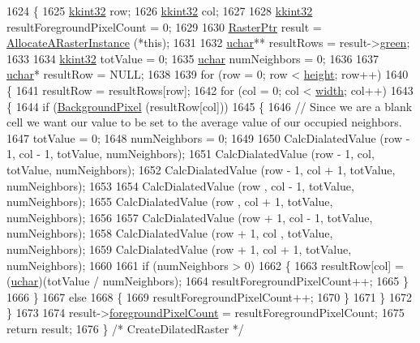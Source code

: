 \begin{DoxyCode}
1624 \{
1625   \hyperlink{namespace_k_k_b_a8fa4952cc84fda1de4bec1fbdd8d5b1b}{kkint32}  row;
1626   \hyperlink{namespace_k_k_b_a8fa4952cc84fda1de4bec1fbdd8d5b1b}{kkint32}  col;
1627 
1628   \hyperlink{namespace_k_k_b_a8fa4952cc84fda1de4bec1fbdd8d5b1b}{kkint32}  resultForegroundPixelCount = 0;
1629 
1630   \hyperlink{class_k_k_b_1_1_raster}{RasterPtr}  result = \hyperlink{class_k_k_b_1_1_raster_aa879980d112c01cb7ad9a3cfc7cd6f64}{AllocateARasterInstance} (*\textcolor{keyword}{this});
1631 
1632   \hyperlink{namespace_k_k_b_ace9969169bf514f9ee6185186949cdf7}{uchar}** resultRows = result->\hyperlink{class_k_k_b_1_1_raster_a2d2238911145488e226cd2e34fc8448c}{green};
1633 
1634   \hyperlink{namespace_k_k_b_a8fa4952cc84fda1de4bec1fbdd8d5b1b}{kkint32}  totValue     = 0;
1635   \hyperlink{namespace_k_k_b_ace9969169bf514f9ee6185186949cdf7}{uchar}  numNeighbors = 0;
1636 
1637   \hyperlink{namespace_k_k_b_ace9969169bf514f9ee6185186949cdf7}{uchar}*  resultRow = NULL;
1638 
1639   \textcolor{keywordflow}{for}  (row = 0; row < \hyperlink{class_k_k_b_1_1_raster_af39ff189de4fbb6de98392e187efafb7}{height}; row++)
1640   \{
1641     resultRow = resultRows[row];
1642     \textcolor{keywordflow}{for}  (col = 0; col < \hyperlink{class_k_k_b_1_1_raster_ae0bcc103e191c3421d7692dc69ceb554}{width}; col++)
1643     \{
1644       \textcolor{keywordflow}{if}  (\hyperlink{class_k_k_b_1_1_raster_a0756fb5530274d5e28858d3e1633d595}{BackgroundPixel} (resultRow[col]))
1645       \{
1646         \textcolor{comment}{// Since we are a blank cell we want our value to be set to the average value of our occupied
       neighbors.}
1647         totValue     = 0;
1648         numNeighbors = 0;
1649 
1650         CalcDialatedValue (row - 1, col - 1, totValue, numNeighbors);
1651         CalcDialatedValue (row - 1, col,     totValue, numNeighbors);
1652         CalcDialatedValue (row - 1, col + 1, totValue, numNeighbors);
1653 
1654         CalcDialatedValue (row    , col - 1, totValue, numNeighbors);
1655         CalcDialatedValue (row    , col + 1, totValue, numNeighbors);
1656 
1657         CalcDialatedValue (row + 1, col - 1, totValue, numNeighbors);
1658         CalcDialatedValue (row + 1, col    , totValue, numNeighbors);
1659         CalcDialatedValue (row + 1, col + 1, totValue, numNeighbors);
1660 
1661         \textcolor{keywordflow}{if}  (numNeighbors > 0)
1662         \{
1663           resultRow[col] = (\hyperlink{namespace_k_k_b_ace9969169bf514f9ee6185186949cdf7}{uchar})(totValue / numNeighbors);
1664           resultForegroundPixelCount++;
1665         \}
1666       \}
1667       \textcolor{keywordflow}{else}
1668       \{
1669         resultForegroundPixelCount++;
1670       \}
1671     \}
1672   \}
1673 
1674   result->\hyperlink{class_k_k_b_1_1_raster_aa7e86253f4b9c347da718732e44b60e8}{foregroundPixelCount} = resultForegroundPixelCount;
1675   \textcolor{keywordflow}{return}  result;
1676 \}  \textcolor{comment}{/* CreateDilatedRaster */}
\end{DoxyCode}
